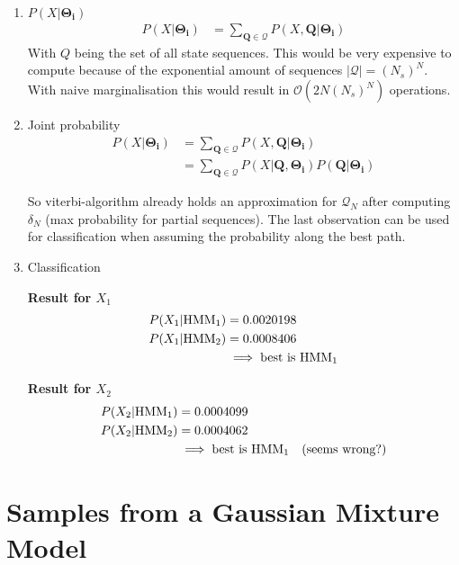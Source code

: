 \documentclass[12pt,a4paper]{article}
\begin{document}
\begin{enumerate}[label*={\arabic*.}]
  \item $P(X|\mathbf{\Theta_i})$
\begin{align*}
P(X|\mathbf{\Theta_i}) & = \sum_{\mathbf{Q}\in\mathcal{Q}}
P(X, \mathbf{Q}|\mathbf{\Theta_i})
\end{align*}
With $\mathit{Q}$ being the set of all state sequences. This would be very
expensive to compute because of the exponential amount of sequences
$|\mathcal{Q}| = (N_s)^N$. With naive marginalisation this would result in
$\mathcal{O}(2N(N_s)^N)$ operations\autocite{lecuter_notes_spsc}.

  \item Joint probability
\begin{align*}
P(X|\mathbf{\Theta_i}) & = \sum_{\mathbf{Q}\in\mathcal{Q}}
P(X, \mathbf{Q}|\mathbf{\Theta_i})\\
& = \sum_{\mathbf{Q}\in\mathcal{Q}}
P(X|\mathbf{Q},\mathbf{\Theta_i})P(\mathbf{Q}|\mathbf{\Theta_i})
\end{align*}

So viterbi-algorithm already holds an approximation for $\mathcal{Q}_N$ after
computing $\delta_N$ (max probability for partial sequences). The last
observation can be used for classification when assuming the probability
along the best path.

 \item Classification

 \textbf{Result for $X_1$}
  \begin{align*}
P(X_1 | \textnormal{HMM}_1) & = 0.0020198\\
P(X_1 | \textnormal{HMM}_2) & = 0.0008406\\
& \implies \textnormal{best is } \textnormal{HMM}_1 
\end{align*}

 \textbf{Result for $X_2$}
  \begin{align*}
P(X_2 | \textnormal{HMM}_1) & = 0.0004099\\
P(X_2 | \textnormal{HMM}_2) & = 0.0004062\\
& \implies \textnormal{best is } \textnormal{HMM}_1 \quad\textnormal{(seems
wrong?)}
\end{align*}

\end{enumerate}

\newpage
\section{Samples from a Gaussian Mixture Model}
\end{document}
